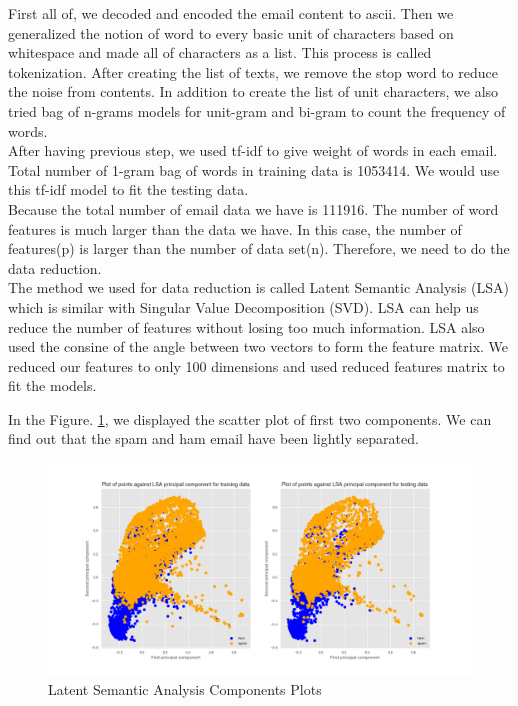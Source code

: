 First all of, we decoded and encoded the email content to ascii. Then we generalized the notion of word to every basic unit of characters based on whitespace and made all of characters as a list. This process is called tokenization. After creating the list of texts, we remove the stop word to reduce the noise from contents. In addition to create the list of unit characters, we also tried bag of n-grams models for unit-gram and bi-gram to count the frequency of words.\\

After having previous step, we used tf-idf to give weight of words in each email. Total number of 1-gram bag of words in training data is 1053414. We would use this tf-idf model to fit the testing data.\\ Because the total number of email data we have is 111916. The number of word features is much larger than the data we have. In this case, the number of features(p) is larger than the number of data set(n). Therefore, we need to do the data reduction.\\

The method we used for data reduction is called Latent Semantic Analysis (LSA) which is similar with Singular Value Decomposition (SVD). LSA can help us reduce the number of features without losing too much information. LSA also used the consine of the angle between two vectors to form the feature matrix. We reduced our features to only 100 dimensions and used reduced features matrix to fit the models.

In the Figure. \ref{fig:FE}, we displayed the scatter plot of first two components. We can find out that the spam and ham email have been lightly separated.

\begin{figure}[ht!]
    \centering
    \includegraphics[scale=0.4]{data_reduction_cp12.png}
    \caption{Latent Semantic Analysis Components Plots}
    \label{fig:FE}
\end{figure}

